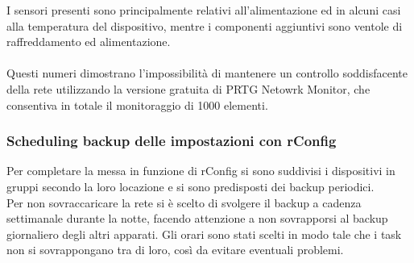 \documentclass[Realizzazione.tex]{subfiles}
\begin{document}
I sensori presenti sono principalmente relativi all'alimentazione ed in alcuni casi alla temperatura del dispositivo, mentre i componenti aggiuntivi sono ventole di raffreddamento ed alimentazione. \\\\
Questi numeri dimostrano l'impossibilità di mantenere un controllo soddisfacente della rete utilizzando la versione gratuita di PRTG Netowrk Monitor, che consentiva in totale il monitoraggio di 1000 elementi.

\subsubsection{Scheduling backup delle impostazioni con rConfig}

Per completare la messa in funzione di rConfig si sono suddivisi i dispositivi in gruppi secondo la loro locazione e si sono predisposti dei backup periodici. \\
Per non sovraccaricare la rete si è scelto di svolgere il backup a cadenza settimanale durante la notte, facendo attenzione a non sovrapporsi al backup giornaliero degli altri apparati. Gli orari sono stati scelti in modo tale che i task non si sovrappongano tra di loro, così da evitare eventuali problemi.\\
\end{document}
